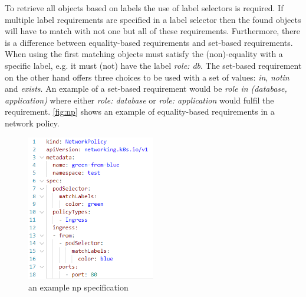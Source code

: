 To retrieve all objects based on labels the use of label selectors is required.  If multiple label requirements are specified in a label selector then the found objects will have to match with not one but all of these requirements. Furthermore, there is a difference between equality-based requirements and set-based requirements. When using the first matching objects must satisfy the (non)-equality with a specific label, e.g. it must (not) have the label \textit{role: db}. The set-based requirement on the other hand offers three choices to be used with a set of values: \textit{in}, \textit{notin} and \textit{exists}. An example of a set-based requirement would be \textit{role in (database, application)} where either \textit{role: database} or \textit{role: application} would fulfil the requirement. \autoref{fig:np} shows an example of equality-based requirements in a network policy. \cite{labels}
\\[10pt]

\begin{figure}[htbp]
  \centering
  \includegraphics[width=0.5\textwidth]{images/np.png} 
  \caption{an example \acrshort{np} specification}
  \label{fig:np}
\end{figure}


